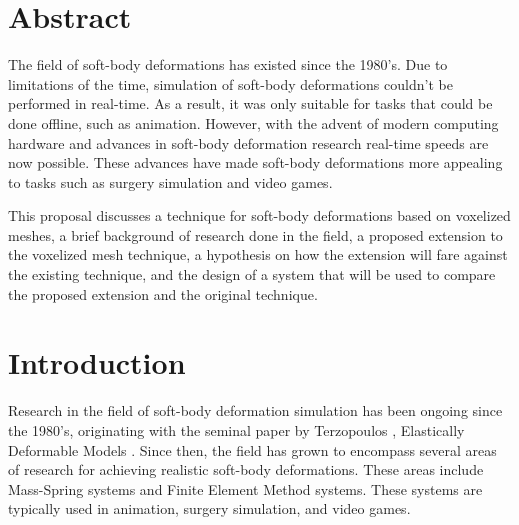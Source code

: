 \section*{Abstract}

The field of soft-body deformations has existed since the 1980's. Due to limitations of the time,
simulation of soft-body deformations couldn't be performed in real-time. As a result, it was only 
suitable for tasks that could be done offline, such as animation. However, with the advent of 
modern computing hardware and advances in soft-body deformation research real-time speeds are now
possible. These advances have made soft-body deformations more appealing to tasks such as surgery 
simulation and video games.

This proposal discusses a technique for soft-body deformations based on voxelized meshes, a brief
background of research done in the field, a proposed extension to the voxelized mesh technique, a 
hypothesis on how the extension will fare against the existing technique, and the design of a system
that will be used to compare the proposed extension and the original technique.

\vfill{}

\setcounter{page}{0} 
\newpage{}

\section{Introduction}

Research in the field of soft-body deformation simulation has been ongoing since the 1980's, 
originating with the seminal paper by Terzopoulos \etal, Elastically Deformable Models 
\cite{Elastically-Deformable-Models}. Since then, the field has 
grown to encompass several areas of research for achieving realistic soft-body deformations. These
areas include Mass-Spring systems and Finite Element Method systems. 
These systems are typically used in animation, surgery simulation, and video games.

